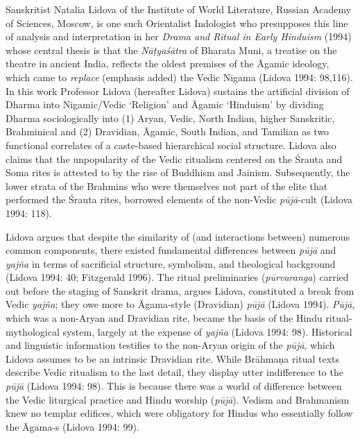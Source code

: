 Sanskritist Natalia Lidova of the Institute of World Literature, Russian Academy of Sciences, Moscow, is one such Orientalist Indologist who presupposes this line of analysis and interpretation in her \textit{Drama and Ritual in Early Hinduism} (1994) whose central thesis is that the \textit{Nāṭyaśātra} of Bharata Muni, a treatise on the theatre in ancient India, reflects the oldest premises of the Āgamic ideology, which came to \textit{replace} (emphasis added) the Vedic Nigama (Lidova 1994: 98,116). In this work Professor Lidova (hereafter Lidova) sustains the artificial division of Dharma into Nigamic/Vedic ‘Religion’ and Āgamic ‘Hinduism’ by dividing Dharma sociologically into (1) Aryan, Vedic, North Indian, higher Sanskritic, Brahminical and (2) Dravidian, Āgamic, South Indian, and Tamilian as two functional correlates of a caste-based hierarchical social structure. Lidova also claims that the unpopularity of the Vedic ritualism centered on the Śrauta and Soma rites is attested to by the rise of Buddhism and Jainism. Subsequently, the lower strata of the Brahmins who were themselves not part of the elite that performed the Śrauta rites, borrowed elements of the non-Vedic \textit{pūjā}-cult (Lidova 1994: 118).

Lidova argues that despite the similarity of (and interactions between) numerous common components, there existed fundamental differences between \textit{pūjā} and \textit{yajña} in terms of sacrificial structure, symbolism, and theological background (Lidova 1994: 40; Fitzgerald 1996). The ritual preliminaries (\textit{pūrvaranga}) carried out before the staging of Sanskrit drama, argues Lidova, constituted a break from Vedic \textit{yajña}; they owe more to Āgama-style (Dravidian) \textit{pūjā} (Lidova 1994).\textit{ Pūjā}, which was a non-Aryan and Dravidian rite, became the basis of the Hindu ritual-mythological system, largely at the expense of \textit{yajña} (Lidova 1994: 98). Historical and linguistic information testifies to the non-Aryan origin of the\textit{ pūjā}, which Lidova assumes to be an intrinsic Dravidian rite. While Brāhmaṇa ritual texts describe Vedic ritualism to the last detail, they display utter indifference to the \textit{pūjā} (Lidova 1994: 98). This is because there was a world of difference between the Vedic liturgical practice and Hindu worship (\textit{pūjā}). Vedism and Brahmanism knew no templar edifices, which were obligatory for Hindus who essentially follow the Āgama-s (Lidova 1994: 99).

